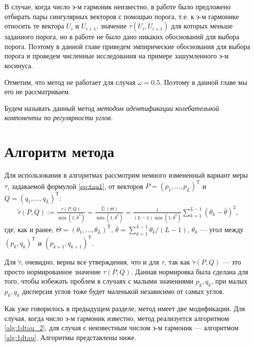 \documentclass[specialist,
               substylefile = spbu.rtx,
               subf,href,colorlinks=true, 12pt]{disser}
\DeclareMathOperator{\D}{\mathbb{D}}
\begin{document}
В случае, когда число
э-м гармоник неизвестно, в работе \cite{Zhornikova2016} было предложено отбирать пары сингулярных векторов с
помощью порога, т.е. к э-м гармонике относить те вектора $U_i$ и $U_{i+1}$, значение  $\tau(U_i, U_{i+1})$ для которых меньше заданного порога, но в работе не было дано никаких обоснований для выбора порога. 
Поэтому в данной главе приведем эмпирические обоснования для выбора порога и проведем численные исследования на примере зашумленного э-м косинуса.    

Отметим, что метод не работает для случая $\omega = 0.5$. Поэтому в данной главе мы его не рассматриваем.

Будем называть данный метод \textit{методом идентификации колебательной компоненты по регулярности углов}.


\section{Алгоритм метода}
Для использования в алгоритмах рассмотрим немного измененный вариант меры $\tau$, задаваемой формулой \eqref{eq:tau1}, от векторов $P = (p_1,\ldots,p_L)^{\mathrm{T}}$ и $Q=(q_1,\ldots,q_L)^{\mathrm{T}}$:
\begin{gather} \label{eq:tau_norm}
\tilde{\tau}(P, Q) := \frac{\tau(P, Q)}{\min(1, \bar{\theta}^2)} =\frac{\hat{\D}(\Theta)}{\min(1, \bar{\theta}^2)} =\frac{1}{(L-1) \min(1, \bar{\theta}^2)}\sum_{k=1}^{L-1}{\left(\theta_k  - \bar{\theta}\right)^2},
\end{gather} 
где, как и ранее, $\Theta=(\theta_1,\ldots,\theta_L)^{\mathrm{T}}$,
$\bar{\theta} = \sum_{k=1}^{L-1}{\theta_k}/(L-1)$, $\theta_k$ --- угол между  
$\left(p_k, q_{k}\right)^{\mathrm{T}}$ и $\left(p_{k+1}, q_{k+1}\right)^{\mathrm{T}}$.

Для $\tilde{\tau}$, очевидно, верны все утверждения, что и для $\tau$, так как $\tilde{\tau}(P, Q)$ --- это просто нормированное значение $\tau(P, Q)$. Данная нормировка была сделана для того, чтобы избежать проблем в случаях с малыми значениями $p_k, q_{k}$, при малых $p_k, q_{k}$  дисперсия углов тоже будет маленькой независимо от самых углов. 

Как уже говорилось в предыдущем разделе, метод имеет две модификации. Для случая, когда число э-м гармоник известно, метод реализуется алгоритмом \ref{alg:1dtau_2}, для случая с неизвестным числом э-м гармоник --- алгоритмом \ref{alg:1dtau}. Алгоритмы представлены ниже.
\end{document}
